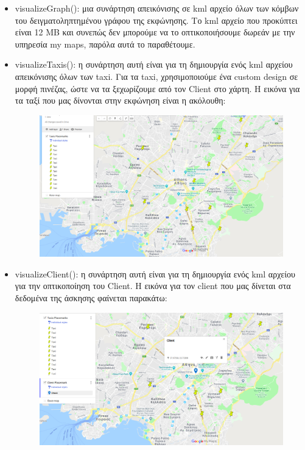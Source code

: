 \documentclass[a4paper,oneside, 11pt]{article}
\begin{document}
\begin{itemize}
\item visualizeGraph(): μια συνάρτηση απεικόνισης σε kml αρχείο όλων των κόμβων του δειγματοληπτημένου γράφου της εκφώνησης. Το kml αρχείο που προκύπτει είναι 12 MB και συνεπώς δεν μπορούμε να το οπτικοποιήσουμε δωρεάν με την υπηρεσία my maps, παρόλα αυτά το παραθέτουμε. 
\item visualizeTaxis(): η συνάρτηση αυτή είναι για τη δημιουργία ενός kml αρχείου απεικόνισης όλων των taxi. Για τα taxi, χρησιμοποιούμε ένα custom design σε μορφή πινέζας, ώστε να τα ξεχωρίζουμε από τον Client στο χάρτη. Η εικόνα για τα ταξί που μας δίνονται στην εκφώνηση είναι η ακόλουθη:

\begin{figure}[H]
\includegraphics[width=\textwidth]{taxis.png}
\end{figure}


\item visualizeClient(): η συνάρτηση αυτή είναι για τη δημιουργία ενός kml αρχείου για την οπτικοποίηση του Client. Η εικόνα για τον client που μας δίνεται στα δεδομένα της άσκησης φαίνεται παρακάτω:


\begin{figure}[H]
\includegraphics[width=\textwidth]{client.png}
\end{figure}


\end{itemize}
\end{document}
